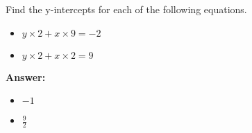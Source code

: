  Find the y-intercepts for each of the following equations. \begin{itemize}\item \( y \times 2 + x \times 9 = -2 \)\item \( y \times 2 + x \times 2 = 9 \)\end{itemize}

        \textbf{Answer:} \begin{itemize}\item \( -1 \)\item \( \frac{9}{2} \)\end{itemize}

